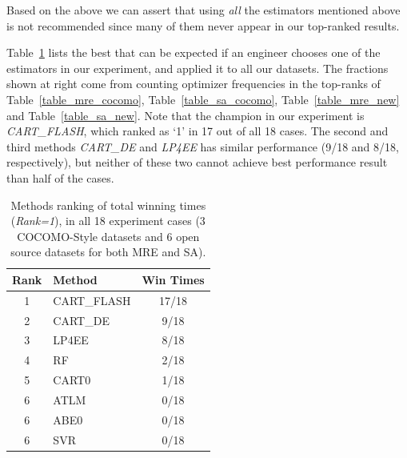 \documentclass[sigconf,review]{acmart}
\begin{document}
 Based on the above we can assert that
 using  {\em all} the estimators mentioned above is not recommended since many of them never appear in our top-ranked results.










Table~\ref{tbl:methodsrk} lists the best that can be expected if an engineer  chooses one of the
estimators in our experiment, and applied it to all our datasets.
The fractions shown at right come from counting optimizer frequencies in the top-ranks of  Table~\ref{table_mre_cocomo}, Table~\ref{table_sa_cocomo}, Table~\ref{table_mre_new}
and Table~\ref{table_sa_new}. Note that
the champion in our experiment is {\it CART\_FLASH}, which ranked as `1' in 17 out of all 18 cases. The second and third methods {\it CART\_DE} and {\it LP4EE} has similar performance (9/18 and 8/18, respectively), but neither of these two cannot achieve best performance result than half of the cases.


\begin{table}
\small
 \caption{Methods ranking of total winning times ({\em Rank=1}), in all 18 experiment cases (3 COCOMO-Style datasets and 6 open source datasets for both MRE and SA).}\label{tbl:methodsrk}
\centering
{  
\begin{tabular}{clc} \\
  {\textbf{Rank}}& \textbf{Method} & \textbf{Win Times}\\
  \hline
    1 &      CART\_FLASH    &    17/18\\\hline 
    2 &      CART\_DE       &    9/18\\\hline 
    3 &      LP4EE          &    8/18\\\hline 
    4 &      RF             &    2/18\\\hline 
    5 &      CART0          &    1/18\\\hline 
    6 &      ATLM           &    0/18\\
    6 &      ABE0           &    0/18\\
    6 &      SVR            &    0/18\\
    \hline   
\end{tabular}}
\end{table}
\end{document}
